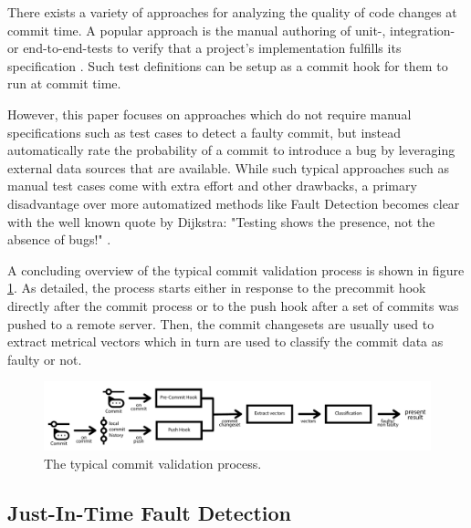 There exists a variety of approaches for analyzing the quality of code changes at commit time. A popular approach is the manual authoring of unit-, integration- or end-to-end-tests to verify that a project's implementation fulfills its specification \cite{Maayan2018}. Such test definitions can be setup as a commit hook for them to run at commit time.

However, this paper focuses on approaches which do not require manual specifications such as test cases to detect a faulty commit, but instead automatically rate the probability of a commit to introduce a bug by leveraging external data sources that are available.
While such typical approaches such as manual test cases come with extra effort and other drawbacks, a primary disadvantage over more automatized methods like Fault Detection becomes clear with the well known quote by Dijkstra: "Testing shows the presence, not the absence of bugs!" \cite{JohnN1969}.

A concluding overview of the typical commit validation process is shown in figure \ref{fig:cvprocess}. As detailed, the process starts either in response to the precommit hook directly after the commit process or to the push hook after a set of commits was pushed to a remote server. Then, the commit changesets are usually used to extract metrical vectors which in turn are used to classify the commit data as faulty or not.

\begin{figure}[t]
	\centering
	\includegraphics[width=\textwidth]{images/commitvalidation-process/cvprocess}
	\caption{The typical commit validation process.}
	\label{fig:cvprocess}
\end{figure}

\subsection{Just-In-Time Fault Detection}

